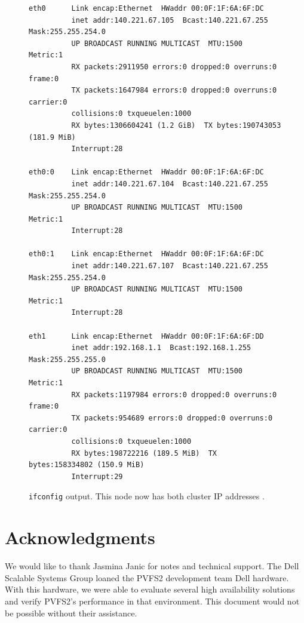 \documentclass[11pt]{article}
\begin{document}
\begin{figure}
\begin{scriptsize}
\begin{verbatim}
eth0      Link encap:Ethernet  HWaddr 00:0F:1F:6A:6F:DC  
          inet addr:140.221.67.105  Bcast:140.221.67.255  Mask:255.255.254.0
          UP BROADCAST RUNNING MULTICAST  MTU:1500  Metric:1
          RX packets:2911950 errors:0 dropped:0 overruns:0 frame:0
          TX packets:1647984 errors:0 dropped:0 overruns:0 carrier:0
          collisions:0 txqueuelen:1000 
          RX bytes:1306604241 (1.2 GiB)  TX bytes:190743053 (181.9 MiB)
          Interrupt:28 

eth0:0    Link encap:Ethernet  HWaddr 00:0F:1F:6A:6F:DC  
          inet addr:140.221.67.104  Bcast:140.221.67.255  Mask:255.255.254.0
          UP BROADCAST RUNNING MULTICAST  MTU:1500  Metric:1
          Interrupt:28 

eth0:1    Link encap:Ethernet  HWaddr 00:0F:1F:6A:6F:DC  
          inet addr:140.221.67.107  Bcast:140.221.67.255  Mask:255.255.254.0
          UP BROADCAST RUNNING MULTICAST  MTU:1500  Metric:1
          Interrupt:28 

eth1      Link encap:Ethernet  HWaddr 00:0F:1F:6A:6F:DD  
          inet addr:192.168.1.1  Bcast:192.168.1.255  Mask:255.255.255.0
          UP BROADCAST RUNNING MULTICAST  MTU:1500  Metric:1
          RX packets:1197984 errors:0 dropped:0 overruns:0 frame:0
          TX packets:954689 errors:0 dropped:0 overruns:0 carrier:0
          collisions:0 txqueuelen:1000 
          RX bytes:198722216 (189.5 MiB)  TX bytes:158334802 (150.9 MiB)
          Interrupt:29 
\end{verbatim}
\end{scriptsize}
\caption{\texttt{ifconfig} output.  This node now has both cluster IP
addresses .}
\label{fig:ifconfig-aa}
\end{figure}

\section{Acknowledgments}
We would like to thank Jasmina Janic for notes and technical support.
The Dell Scalable Systems Group loaned the PVFS2 development team Dell
hardware.  With this hardware, we were able to evaluate several high
availability solutions and verify PVFS2's performance in that
environment.  This document would not be possible without their
assistance.
\end{document}

